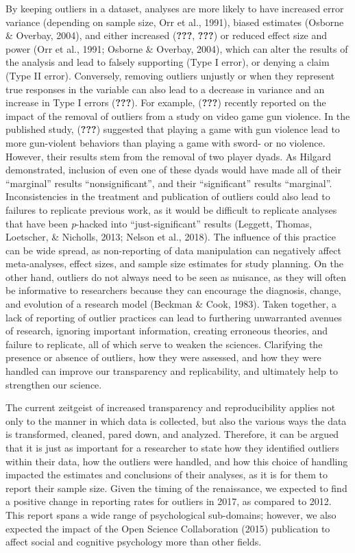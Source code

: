 \documentclass[english,,man,mask]{apa6}
\theoremstyle{definition}
\theoremstyle{definition}
\theoremstyle{definition}
\theoremstyle{remark}
\begin{document}
By keeping outliers in a dataset, analyses are more likely to have
increased error variance (depending on sample size, Orr et al., 1991),
biased estimates (Osborne \& Overbay, 2004), and either increased
({\textbf{???}}, {\textbf{???}}) or reduced effect size and power (Orr
et al., 1991; Osborne \& Overbay, 2004), which can alter the results of
the analysis and lead to falsely supporting (Type I error), or denying a
claim (Type II error). Conversely, removing outliers unjustly or when
they represent true responses in the variable can also lead to a
decrease in variance and an increase in Type I errors ({\textbf{???}}).
For example, ({\textbf{???}}) recently reported on the impact of the
removal of outliers from a study on video game gun violence. In the
published study, ({\textbf{???}}) suggested that playing a game with gun
violence lead to more gun-violent behaviors than playing a game with
sword- or no violence. However, their results stem from the removal of
two player dyads. As Hilgard demonstrated, inclusion of even one of
these dyads would have made all of their \enquote{marginal} results
\enquote{nonsignificant}, and their \enquote{significant} results
\enquote{marginal}. Inconsistencies in the treatment and publication of
outliers could also lead to failures to replicate previous work, as it
would be difficult to replicate analyses that have been \emph{p}-hacked
into \enquote{just-significant} results (Leggett, Thomas, Loetscher, \&
Nicholls, 2013; Nelson et al., 2018). The influence of this practice can
be wide spread, as non-reporting of data manipulation can negatively
affect meta-analyses, effect sizes, and sample size estimates for study
planning. On the other hand, outliers do not always need to be seen as
nuisance, as they will often be informative to researchers because they
can encourage the diagnosis, change, and evolution of a research model
(Beckman \& Cook, 1983). Taken together, a lack of reporting of outlier
practices can lead to furthering unwarranted avenues of research,
ignoring important information, creating erroneous theories, and failure
to replicate, all of which serve to weaken the sciences. Clarifying the
presence or absence of outliers, how they were assessed, and how they
were handled can improve our transparency and replicability, and
ultimately help to strengthen our science.

The current zeitgeist of increased transparency and reproducibility
applies not only to the manner in which data is collected, but also the
various ways the data is transformed, cleaned, pared down, and analyzed.
Therefore, it can be argued that it is just as important for a
researcher to state how they identified outliers within their data, how
the outliers were handled, and how this choice of handling impacted the
estimates and conclusions of their analyses, as it is for them to report
their sample size. Given the timing of the renaissance, we expected to
find a positive change in reporting rates for outliers in 2017, as
compared to 2012. This report spans a wide range of psychological
sub-domains; however, we also expected the impact of the Open Science
Collaboration (2015) publication to affect social and cognitive
psychology more than other fields.
\end{document}
